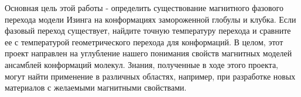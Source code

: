 Основная цель этой работы - определить существование магнитного фазового перехода модели Изинга на конформациях замороженной глобулы и клубка. Если фазовый переход существует, найдите точную температуру перехода и сравните ее с температурой геометрического перехода для конформаций. В целом, этот проект направлен на углубление нашего понимания свойств магнитных моделей ансамблей конформаций молекул. Знания, полученные в ходе этого проекта, могут найти применение в различных областях, например, при разработке новых материалов с желаемыми магнитными свойствами.